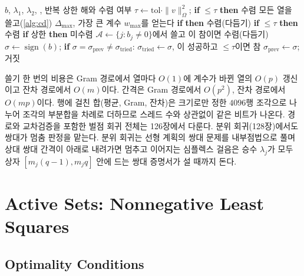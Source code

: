 \begin{algorithm}[htbp]
\begin{algorithmic}[1]
\Require $b$, $\lambda_1$, $\lambda_2$, , 반복 상한
\Ensure 해와 수렴 여부
\State $\tau\gets\mathrm{tol}\cdot\|v\|_\Omega^2$; \textbf{if} $\le\tau$ \textbf{then} \Return 수렴
\Loop
  \State 모든 열을 쓸고(\cref{alg:cd}) $\Delta_{\max}$, 가장 큰 계수 $w_{\max}$를 얻는다
  \State \textbf{if}  \textbf{then} \Return 수렴(다듬기)
    \State \textbf{if} $\le\tau$ \textbf{then} \Return 수렴 
    \State \textbf{if} 상한 \textbf{then} \Return 미수렴
  \EndIf
  \Repeat {}
    \State $\mathcal A\gets\{j:b_j\ne0\}$에서 쓸고 이 참이면 \Return 수렴(다듬기)
\EndLoop
{} 
  \State $\sigma\gets\operatorname{sign}(b)$; \textbf{if} $\sigma=\sigma_{\mathrm{prev}}\ne\sigma_{\mathrm{tried}}$: $\sigma_{\mathrm{tried}}\gets\sigma$, 이 성공하고 $\le\tau$이면 참
  \State $\sigma_{\mathrm{prev}}\gets\sigma$; 거짓
\EndFunction
\end{algorithmic}
\caption{좌표 하강의 바깥 고리 (stardust 의 )}
\label{alg:cd-outer}
\end{algorithm}

쓸기 한 번의 비용은 Gram 경로에서 열마다 $O(1)$에 계수가 바뀐 열의 $O(p)$ 갱신이고 잔차 경로에서 $O(m)$이다. 간격은 Gram 경로에서 $O(p^2)$, 잔차 경로에서 $O(mp)$이다. 행에 걸친 합(평균, Gram, 잔차)은 크기로만 정한 $4096$행 조각으로 나누어 조각의 부분합을 차례로 더하므로 스레드 수와 상관없이 같은 비트가 나온다. 경로와 교차검증을 포함한 벌점 회귀 전체는 126장에서 다룬다. 분위 회귀(128장)에서도 쌍대가 멈춤 판정을 맡는다. 분위 회귀는 선형 계획의 쌍대 문제를 내부점법으로 풀며 상대 쌍대 간격이  아래로 내려가면 멈추고 이어지는 심플렉스 걸음은 승수 $\lambda_j$가 모두 상자 $[m_j(q-1),m_jq]$ 안에 드는 쌍대 증명서가 설 때까지 돈다.

\section{Active Sets: Nonnegative Least Squares}
\label{sec:nnls}

\subsection{Optimality Conditions}

